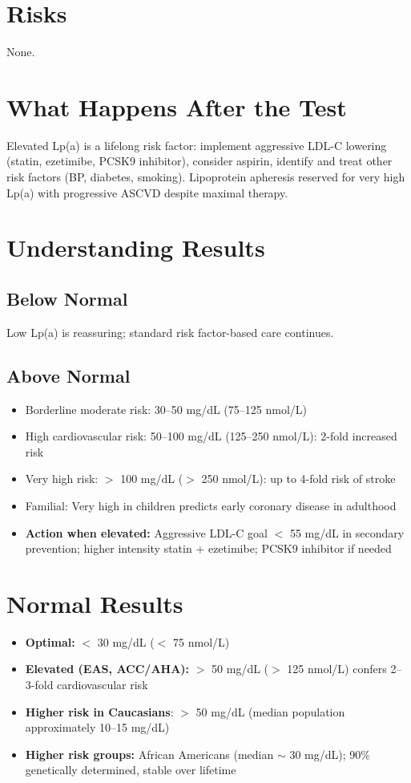 \section*{Risks}
None.

\section*{What Happens After the Test}
Elevated Lp(a) is a lifelong risk factor: implement aggressive LDL-C lowering (statin, ezetimibe, PCSK9 inhibitor), consider aspirin, identify and treat other risk factors (BP, diabetes, smoking). Lipoprotein apheresis reserved for very high Lp(a) with progressive ASCVD despite maximal therapy.

\section*{Understanding Results}

\subsection*{Below Normal}
Low Lp(a) is reassuring; standard risk factor-based care continues.

\subsection*{Above Normal}
\begin{itemize}
  \item Borderline moderate risk: 30--50 mg/dL (75--125 nmol/L)
  \item High cardiovascular risk: 50--100 mg/dL (125--250 nmol/L): 2-fold increased risk
  \item Very high risk: $>$ 100 mg/dL ($>$ 250 nmol/L): up to 4-fold risk of stroke
  \item Familial: Very high in children predicts early coronary disease in adulthood
  \item \textbf{Action when elevated:} Aggressive LDL-C goal $<$ 55 mg/dL in secondary prevention; higher intensity statin + ezetimibe; PCSK9 inhibitor if needed
\end{itemize}

\section*{Normal Results}
\begin{itemize}
  \item \textbf{Optimal:} $<$ 30 mg/dL ($<$ 75 nmol/L)
  \item \textbf{Elevated (EAS, ACC/AHA):} $>$ 50 mg/dL ($>$ 125 nmol/L) confers 2--3-fold cardiovascular risk
  \item \textbf{Higher risk in Caucasians}: $>$ 50 mg/dL (median population approximately 10--15 mg/dL)
  \item \textbf{Higher risk groups:} African Americans (median $\sim$ 30 mg/dL); 90\% genetically determined, stable over lifetime
\end{itemize}

